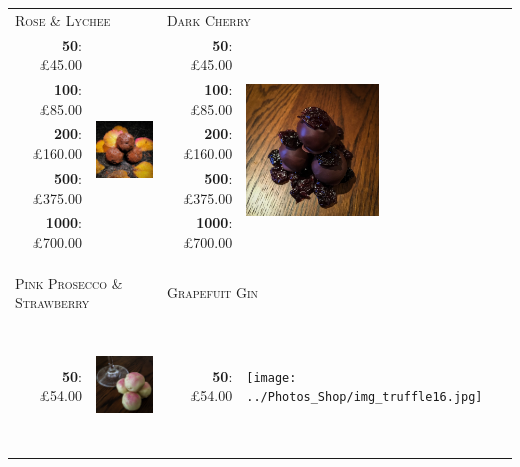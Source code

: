 \documentclass[11pt, english]{article}
\begin{document}
	\begin{table}[h]
	\begin{center}
	\begin{tabular}{r|p{4cm}r|p{4cm}}
		\multicolumn{2}{l}{\textsc{Rose \& Lychee}} & \multicolumn{2}{l}{\textsc{Dark Cherry}}\\
		\textbf{50}: \pounds45.00 & \multirow{8}{*}{\includegraphics[width=3.5cm,height=3.5cm]{../Photos_Shop/img_truffle14.jpg}} & \textbf{50}: \pounds45.00 & \multirow{8}{*}{\includegraphics[width=3.5cm,height=3.5cm]{../Photos_Shop/img_truffle15.jpg}}\\
		\textbf{100}: \pounds85.00 & & \textbf{100}: \pounds85.00 & \\
		\textbf{200}: \pounds160.00 & & \textbf{200}: \pounds160.00 & \\
		\textbf{500}: \pounds375.00 & & \textbf{500}: \pounds375.00 & \\
		\textbf{1000}: \pounds700.00 & & \textbf{1000}: \pounds700.00 & \\
		\multicolumn{4}{l}{}\\
		\multicolumn{4}{l}{}\\
		\multicolumn{4}{l}{}\\
		\multicolumn{2}{l}{\textsc{Pink Prosecco \& Strawberry}} & \multicolumn{2}{l}{\textsc{Grapefuit Gin}}\\
		\textbf{50}: \pounds54.00 & \multirow{5}{*}{\includegraphics[width=3.5cm,height=3.5cm]{../Photos_Shop/img_truffle4.jpg}} & \textbf{50}: \pounds54.00 & \multirow{5}{*}{\texttt{[image: ../Photos\_Shop/img\_truffle16.jpg]}}\\

\end{tabular}
\end{center}
\end{table}
\end{document}
